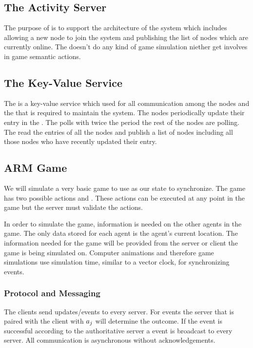 \subsection{The Activity Server}
	The purpose of \activityServer is to support the architecture of the system which includes allowing a new node to join the system and publishing the list of nodes which are currently online. The \activityServer doesn't do any kind of game simulation niether get involves in game semantic actions.

\subsection{The Key-Value Service}
	The \kvService is a key-value service which used for all communication among the nodes and the \activityServer that is required to maintain the system. The nodes periodically update their entry in the \kvService. The \activityServer polls with twice the period the rest of the nodes are polling. The \activityServer read the entries of all the nodes and publish a list of nodes including all those nodes who have recently updated their entry. 

\subsection{ARM Game}

	We will simulate a very basic game to use as our state to synchronize. 
	The game has two possible actions \move{\agent}{\position} and . These actions can be executed at any point in the game but the server must validate the actions. 
	
	In order to simulate the game, information is needed on the other agents in the game. The only data stored for each agent is the agent's current location. The information needed for the game will be provided from the server or client the game is being simulated on. Computer animations and therefore game simulations use simulation time, similar to a vector clock, for synchronizing events.
	
\subsubsection{Protocol and Messaging}

	The clients send updates/events to every server. For  events the server that is paired with the client with $a_{j}$ will determine the outcome. If the  event is successful according to the authoritative server a  event is broadcast to every server. All communication is asynchronous without acknowledgements.


